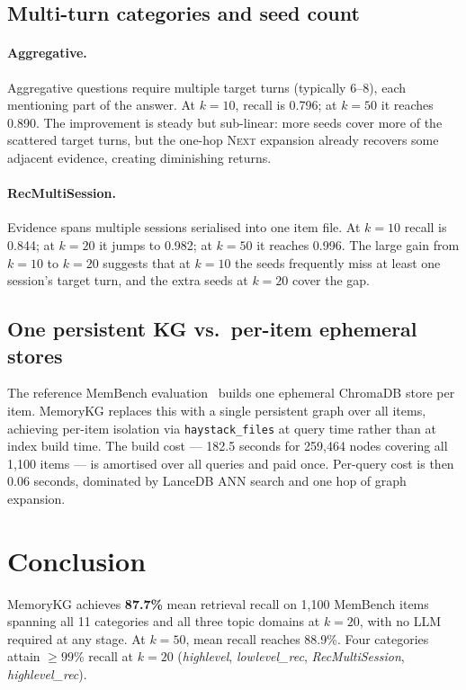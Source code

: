 \documentclass[11pt,a4paper]{article}
\begin{document}
\subsection{Multi-turn categories and seed count}

\paragraph{Aggregative.}
Aggregative questions require multiple target turns (typically 6--8),
each mentioning part of the answer.
At $k{=}10$, recall is 0.796; at $k{=}50$ it reaches 0.890.
The improvement is steady but sub-linear: more seeds cover more of the
scattered target turns, but the one-hop \textsc{Next} expansion already
recovers some adjacent evidence, creating diminishing returns.

\paragraph{RecMultiSession.}
Evidence spans multiple sessions serialised into one item file.
At $k{=}10$ recall is 0.844; at $k{=}20$ it jumps to 0.982; at $k{=}50$
it reaches 0.996.
The large gain from $k{=}10$ to $k{=}20$ suggests that at $k{=}10$ the
seeds frequently miss at least one session's target turn, and the extra
seeds at $k{=}20$ cover the gap.

\subsection{One persistent KG vs.\ per-item ephemeral stores}

The reference MemBench evaluation~\citep{membench2025} builds one
ephemeral ChromaDB store per item.
MemoryKG replaces this with a single persistent graph over all items,
achieving per-item isolation via \texttt{haystack\_files} at query time
rather than at index build time.
The build cost --- 182.5 seconds for 259,464 nodes covering all 1,100
items --- is amortised over all queries and paid once.
Per-query cost is then 0.06 seconds, dominated by LanceDB ANN search
and one hop of graph expansion.

\section{Conclusion}
\label{sec:conclusion}

MemoryKG achieves \textbf{87.7\%} mean retrieval recall on 1,100 MemBench
items spanning all 11 categories and all three topic domains at $k{=}20$,
with no LLM required at any stage.
At $k{=}50$, mean recall reaches 88.9\%.
Four categories attain $\geq 99\%$ recall at $k{=}20$
(\textit{highlevel}, \textit{lowlevel\_rec}, \textit{RecMultiSession},
\textit{highlevel\_rec}).
\end{document}
